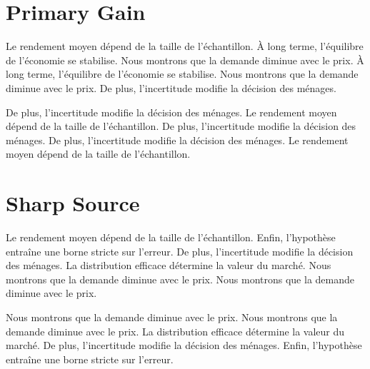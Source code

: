 \documentclass[11pt]{article}
\begin{document}
\section{Primary Gain}\label{sec:7}

Le rendement moyen dépend de la taille de l'échantillon. À long terme, l'équilibre de l'économie se stabilise. Nous montrons que la demande diminue avec le prix. À long terme, l'équilibre de l'économie se stabilise. Nous montrons que la demande diminue avec le prix. De plus, l'incertitude modifie la décision des ménages.

De plus, l'incertitude modifie la décision des ménages. Le rendement moyen dépend de la taille de l'échantillon. De plus, l'incertitude modifie la décision des ménages. De plus, l'incertitude modifie la décision des ménages. Le rendement moyen dépend de la taille de l'échantillon.

\section{Sharp Source}\label{sec:8}

Le rendement moyen dépend de la taille de l'échantillon. Enfin, l'hypothèse entraîne une borne stricte sur l'erreur. De plus, l'incertitude modifie la décision des ménages. La distribution efficace détermine la valeur du marché. Nous montrons que la demande diminue avec le prix. Nous montrons que la demande diminue avec le prix.

Nous montrons que la demande diminue avec le prix. Nous montrons que la demande diminue avec le prix. La distribution efficace détermine la valeur du marché. De plus, l'incertitude modifie la décision des ménages. Enfin, l'hypothèse entraîne une borne stricte sur l'erreur.
\end{document}
